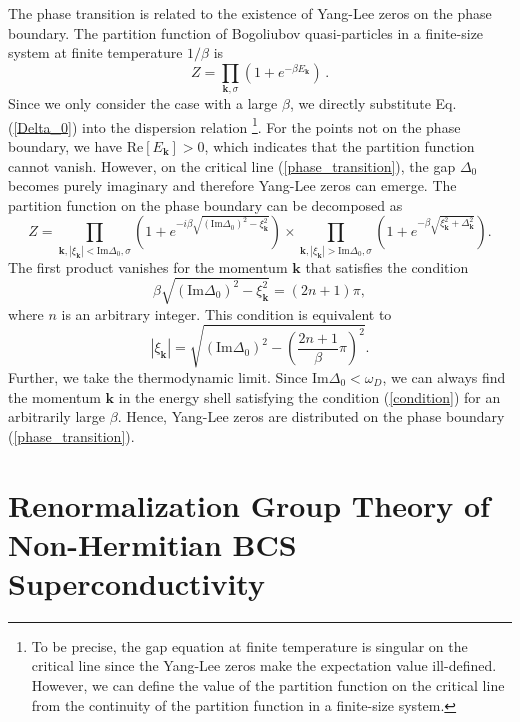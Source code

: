 \documentclass[aps,prl,twocolumn,superscriptaddress]{revtex4-1}
\begin{document}
\begin{bibunit}
The phase transition is related to the existence of Yang-Lee zeros on the phase boundary. The partition function of Bogoliubov quasi-particles in a finite-size system at finite temperature $1/\beta$ is
\begin{equation}
	Z = \prod_{\bm{k},\sigma} (1 + e^{-\beta E_{\bm{k}}})\,.
\end{equation}
Since we only consider the case with a large $\beta$, we directly substitute Eq. (\ref{Delta_0}) into the dispersion relation \footnote{To be precise, the gap equation at finite temperature is singular on the critical line since the Yang-Lee zeros make the expectation value ill-defined. However, we can define the value of the partition function on the critical line from the continuity of the partition function in a finite-size system.}. For the points not on the phase boundary, we have $\text{Re}
[E_{\bm{k}}] > 0$, which indicates that the
partition function cannot vanish. However, on the critical line (\ref{phase_transition}), the gap $\Delta_0$ becomes purely imaginary and therefore Yang-Lee zeros can emerge. The partition function on the phase boundary can be decomposed as
\begin{equation}
	Z = \prod_{\bm{k},|\xi_{\bm{k}}|<\text{Im}\Delta_0,\sigma} \left( 1 + e^{- i \beta \sqrt{\left( \text{Im}\Delta_0 \right)^2 - \xi_{\bm{k}}^2}} \right)\times \prod_{\bm{k},|\xi_{\bm{k}}|>\text{Im}\Delta_0,\sigma}\left( 1 + e^{- \beta \sqrt{\xi_{\bm{k}}^2 +\Delta_{\bm{k}}^2 }} \right).
\end{equation}
The first product vanishes for the momentum $\bm{k}$ that satisfies the condition
\begin{equation}
	\beta \sqrt{\left( \text{Im} \Delta_0 \right)^2 - \xi_{\bm{k}}^2} = (2n + 1) \pi,
\end{equation}
where $n$ is an arbitrary integer. This condition is equivalent to
\begin{equation}
	|\xi_{\bm{k}}| = \sqrt{\left( \text{Im} \Delta_0
		\right)^2 - \left( \frac{2 n + 1}{\beta} \pi \right)^2}.
	\label{condition}
\end{equation}
Further, we take the thermodynamic limit. Since $\text{Im}\Delta_0<\omega_D$, we can always find the momentum $\bm{k}$ in the energy shell satisfying the condition (\ref{condition}) for an arbitrarily large $\beta$. Hence, Yang-Lee zeros are distributed on the phase boundary (\ref{phase_transition}). 

\section{Renormalization Group Theory of Non-Hermitian BCS Superconductivity}\label{RG}


\end{bibunit}
\end{document}
